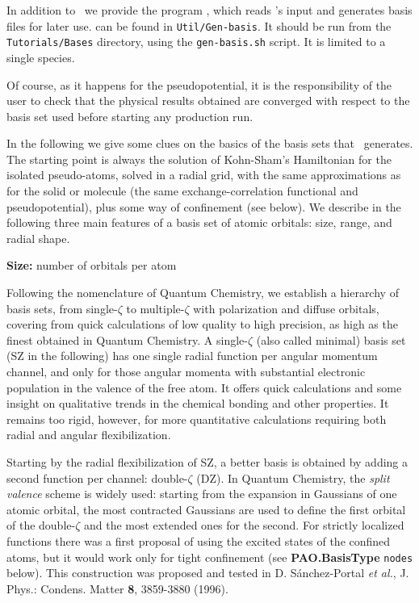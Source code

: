 In addition to \siesta\ we provide the program 
, which reads \siesta's input and
generates basis files for later use.  can be found
in \texttt{Util/Gen-basis}. 
It should be run from the \texttt{Tutorials/Bases} directory,
using the \texttt{gen-basis.sh} script. It is limited to a single species.

Of course, as it happens for the pseudopotential, it is the
responsibility of the user to check that the physical results obtained
are converged with respect to the basis set used before starting any
production run.

In the following we give some clues on the basics of the basis sets
that \siesta\ generates.
  The starting point is always the solution of Kohn-Sham's Hamiltonian
for the isolated pseudo-atoms, solved in a radial grid,
with the same approximations as for the solid or molecule
(the same exchange-correlation functional and  pseudopotential),
plus some way of confinement (see below).
  We describe in the following three main features of a
basis set of atomic orbitals: size, range, and radial shape.

\textbf{Size:} number of orbitals per atom

  Following the nomenclature of Quantum Chemistry, we establish
a hierarchy of basis sets, from single-$\zeta$ to multiple-$\zeta$
with polarization and diffuse orbitals, covering from quick calculations
of low quality to high precision, as high as the finest obtained in
Quantum Chemistry.
  A single-$\zeta$ (also called minimal) basis set (SZ in the following)
has one single radial function per angular momentum channel, and only for
those angular momenta with substantial electronic population in the valence of
the free atom.
  It offers quick calculations and some insight on qualitative trends
in the chemical bonding and other properties.
  It remains too rigid, however, for more quantitative calculations
requiring both radial and angular flexibilization.

  Starting by the radial flexibilization of SZ, a better basis is obtained
by adding a second function per channel: double-$\zeta$ (DZ).
  In Quantum Chemistry, the \textit{split valence} scheme
is widely used: starting from the expansion in Gaussians of one atomic
orbital, the most contracted Gaussians are used to define the first
orbital of the double-$\zeta$ and the most extended ones for the second.
  For strictly localized functions there was a first proposal
of using the excited states of the confined atoms, but it would work only
for tight confinement (see \textbf{PAO.BasisType} \texttt{nodes} below).
  This construction was proposed and tested in D. S\'anchez-Portal
\textit{et al.}, J. Phys.: Condens. Matter \textbf{8}, 3859-3880 (1996).

